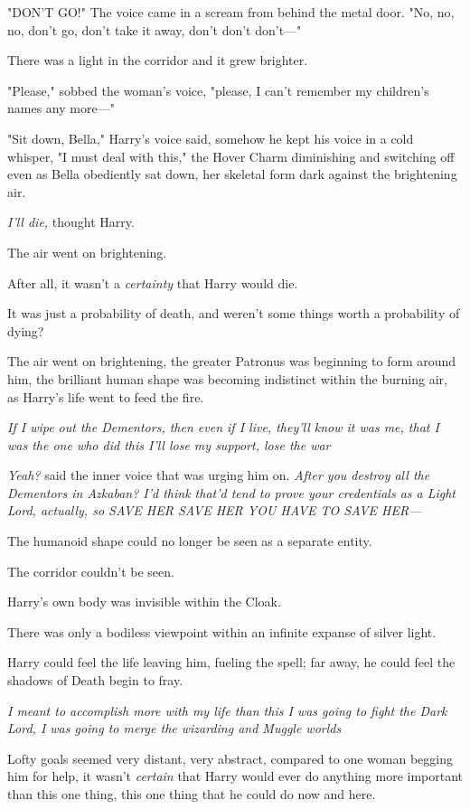 "DON'T GO!" The voice came in a scream from behind the metal door. "No, no, no,
don't go, don't take it away, don't don't don't—"

There was a light in the corridor and it grew brighter.

"Please," sobbed the woman's voice, "please, I can't remember my children's
names any more—"

"Sit down, Bella," Harry's voice said, somehow he kept his voice in a cold
whisper, "I must deal with this," the Hover Charm diminishing and switching off
even as Bella obediently sat down, her skeletal form dark against the
brightening air.

\emph{I'll die,} thought Harry.

The air went on brightening.

After all, it wasn't a \emph{certainty} that Harry would die.

It was just a probability of death, and weren't some things worth a probability
of dying?

The air went on brightening, the greater Patronus was beginning to form around
him, the brilliant human shape was becoming indistinct within the burning air,
as Harry's life went to feed the fire.

\emph{If I wipe out the Dementors, then even if I live, they'll know it was me,
that I was the one who did this{\el} I'll lose my support, lose the
war{\el}}

\emph{Yeah?} said the inner voice that was urging him on. \emph{After you
destroy all the Dementors in Azkaban? I'd think that'd tend to prove your
credentials as a Light Lord, actually, so SAVE HER SAVE HER YOU HAVE TO SAVE
HER—}

The humanoid shape could no longer be seen as a separate entity.

The corridor couldn't be seen.

Harry's own body was invisible within the Cloak.

There was only a bodiless viewpoint within an infinite expanse of silver light.

Harry could feel the life leaving him, fueling the spell; far away, he could
feel the shadows of Death begin to fray.

\emph{I meant to accomplish more with my life than this{\el} I was going to
fight the Dark Lord, I was going to merge the wizarding and Muggle
worlds{\el}}

Lofty goals seemed very distant, very abstract, compared to one woman begging
him for help, it wasn't \emph{certain} that Harry would ever do anything more
important than this one thing, this one thing that he could do now and here.

